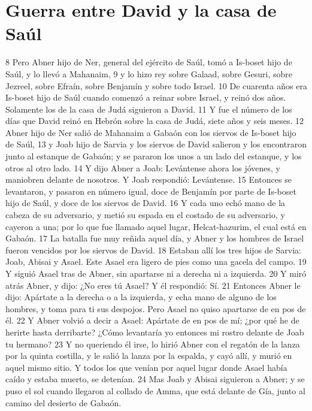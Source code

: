 \section*{Guerra entre David y la casa de Saúl}

8 Pero Abner hijo de Ner, general del ejército de Saúl, tomó a Is-boset hijo de Saúl, y lo llevó a Mahanaim,
9 y lo hizo rey sobre Galaad, sobre Gesuri, sobre Jezreel, sobre Efraín, sobre Benjamín y sobre todo Israel.
10 De cuarenta años era Is-boset hijo de Saúl cuando comenzó a reinar sobre Israel, y reinó dos años. Solamente los de la casa de Judá siguieron a David.
11 Y fue el número de los días que David reinó en Hebrón sobre la casa de Judá, siete años y seis meses.
12 Abner hijo de Ner salió de Mahanaim a Gabaón con los siervos de Is-boset hijo de Saúl,
13 y Joab hijo de Sarvia y los siervos de David salieron y los encontraron junto al estanque de Gabaón; y se pararon los unos a un lado del estanque, y los otros al otro lado.
14 Y dijo Abner a Joab: Levántense ahora los jóvenes, y maniobren delante de nosotros. Y Joab respondió: Levántense.
15 Entonces se levantaron, y pasaron en número igual, doce de Benjamín por parte de Is-boset hijo de Saúl, y doce de los siervos de David.
16 Y cada uno echó mano de la cabeza de su adversario, y metió su espada en el costado de su adversario, y cayeron a una; por lo que fue llamado aquel lugar, Helcat-hazurim, el cual está en Gabaón.
17 La batalla fue muy reñida aquel día, y Abner y los hombres de Israel fueron vencidos por los siervos de David.
18 Estaban allí los tres hijos de Sarvia: Joab, Abisai y Asael. Este Asael era ligero de pies como una gacela del campo.
19 Y siguió Asael tras de Abner, sin apartarse ni a derecha ni a izquierda.
20 Y miró atrás Abner, y dijo: ¿No eres tú Asael? Y él respondió: Sí.
21 Entonces Abner le dijo: Apártate a la derecha o a la izquierda, y echa mano de alguno de los hombres, y toma para ti sus despojos. Pero Asael no quiso apartarse de en pos de él.
22 Y Abner volvió a decir a Asael: Apártate de en pos de mí; ¿por qué he de herirte hasta derribarte? ¿Cómo levantaría yo entonces mi rostro delante de Joab tu hermano?
23 Y no queriendo él irse, lo hirió Abner con el regatón de la lanza por la quinta costilla, y le salió la lanza por la espalda, y cayó allí, y murió en aquel mismo sitio. Y todos los que venían por aquel lugar donde Asael había caído y estaba muerto, se detenían.
24 Mas Joab y Abisai siguieron a Abner; y se puso el sol cuando llegaron al collado de Amma, que está delante de Gía, junto al camino del desierto de Gabaón.
